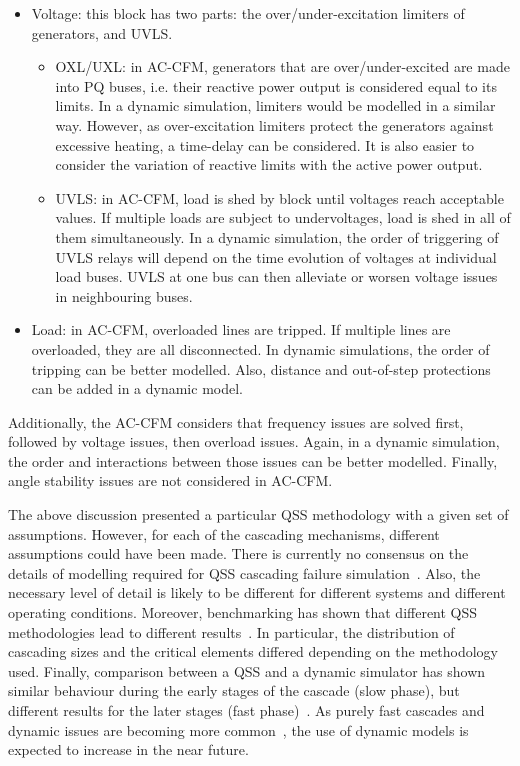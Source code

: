\begin{itemize}
    \item Voltage: this block has two parts: the over/under-excitation limiters of generators, and UVLS. 
    \begin{itemize}
        \item OXL/UXL: in AC-CFM, generators that are over/under-excited are made into PQ buses, i.e. their reactive power output is considered equal to its limits. In a dynamic simulation, limiters would be modelled in a similar way. However, as over-excitation limiters protect the generators against excessive heating, a time-delay can be considered. It is also easier to consider the variation of reactive limits with the active power output.
        \item UVLS: in AC-CFM, load is shed by block until voltages reach acceptable values. If multiple loads are subject to undervoltages, load is shed in all of them simultaneously. In a dynamic simulation, the order of triggering of UVLS relays will depend on the time evolution of voltages at individual load buses. UVLS at one bus can then alleviate or worsen voltage issues in neighbouring buses.
    \end{itemize}
    \item Load: in AC-CFM, overloaded lines are tripped. If multiple lines are overloaded, they are all disconnected. In dynamic simulations, the order of tripping can be better modelled. Also, distance and out-of-step protections can be added in a dynamic model.
\end{itemize}

Additionally, the AC-CFM considers that frequency issues are solved first, followed by voltage issues, then overload issues. Again, in a dynamic simulation, the order and interactions between those issues can be better modelled. Finally, angle stability issues are not considered in AC-CFM.

The above discussion presented a particular QSS methodology with a given set of assumptions. However, for each of the cascading mechanisms, different assumptions could have been made. There is currently no consensus on the details of modelling required for QSS cascading failure simulation~\cite{Benchmarking2018, BenefitsAndChallengesDynamicPreece}. Also, the necessary level of detail is likely to be different for different systems and different operating conditions. Moreover, benchmarking has shown that different QSS methodologies lead to different results~\cite{Benchmarking2018}. In particular, the distribution of cascading sizes and the critical elements differed depending on the methodology used. Finally, comparison between a QSS and a dynamic simulator has shown similar behaviour during the early stages of the cascade (slow phase), but different results for the later stages (fast phase)~\cite{BenchmarkingStaticVsDynamic}. As purely fast cascades and dynamic issues are becoming more common~\cite{cascadeAcceleration}, the use of dynamic models is expected to increase in the near future.

